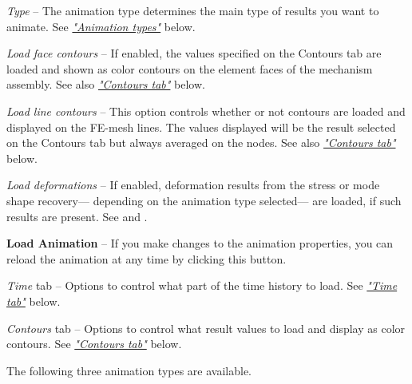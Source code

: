 \begin{bulletlist}
\item{\sl Type} --
  The animation type determines the main type of results you want to animate.
  See \protect\hyperlink{animation-types}{\sl"Animation types"} below.

\item{\sl Load face contours} --
  If enabled, the values specified on the Contours tab are loaded and shown as
  color contours on the element faces of the mechanism assembly. See also
  \protect\hyperlink{contours-tab}{\sl"Contours tab"} below.

\item{\sl Load line contours} --
  This option controls whether or not contours are loaded and displayed
  on the FE-mesh lines. The values displayed will be the result selected on the
  Contours tab but always averaged on the nodes. See also
  \protect\hyperlink{contours-tab}{\sl"Contours tab"} below.


\item{\sl Load deformations} --
  If enabled, deformation results from the stress or mode shape recovery---
  depending on the animation type selected--- are loaded,
  if such results are present. See
   and
  .

\item\textbf{Load Animation} --
  If you make changes to the animation properties, you can reload the animation
  at any time by clicking this button.

\item{\sl Time} tab --
  Options to control what part of the time history to load.
  See \protect\hyperlink{time-tab-animation}{\sl"Time tab"} below.

\item{\sl Contours} tab --
  Options to control what result values to load and display as color contours.
  See \protect\hyperlink{contours-tab}{\sl"Contours tab"} below.
\end{bulletlist}


The following three animation types are available.

